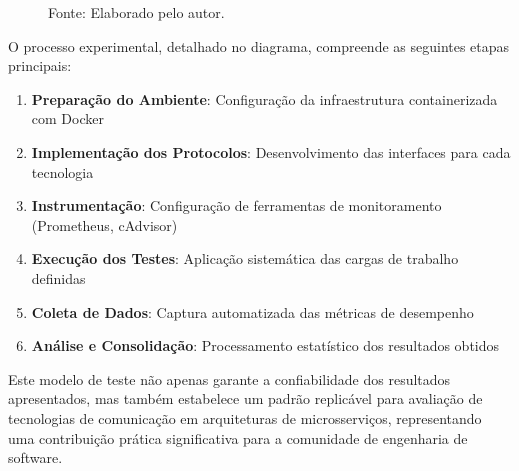 \begin{figure}[H]
{\par \raggedright \footnotesize Fonte: Elaborado pelo autor.\par}
\end{figure}

O processo experimental, detalhado no diagrama, compreende as seguintes etapas principais:

\begin{enumerate}
\item \textbf{Preparação do Ambiente}: Configuração da infraestrutura containerizada com Docker
\item \textbf{Implementação dos Protocolos}: Desenvolvimento das interfaces para cada tecnologia
\item \textbf{Instrumentação}: Configuração de ferramentas de monitoramento (Prometheus, cAdvisor)
\item \textbf{Execução dos Testes}: Aplicação sistemática das cargas de trabalho definidas
\item \textbf{Coleta de Dados}: Captura automatizada das métricas de desempenho
\item \textbf{Análise e Consolidação}: Processamento estatístico dos resultados obtidos
\end{enumerate}

Este modelo de teste não apenas garante a confiabilidade dos resultados apresentados, mas também estabelece um padrão replicável para avaliação de tecnologias de comunicação em arquiteturas de microsserviços, representando uma contribuição prática significativa para a comunidade de engenharia de software.



